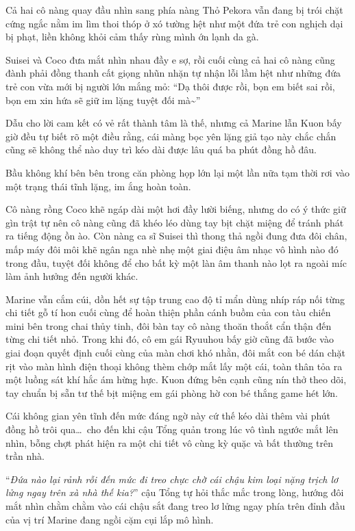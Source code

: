 \documentclass[../main.tex]{subfiles}
\begin{document}
Cả hai cô nàng quay đầu nhìn sang phía nàng Thỏ Pekora vẫn đang bị trói chặt cứng ngắc nằm im lìm thoi thóp ở xó tường hệt như một đứa trẻ con nghịch dại bị phạt, liền không khỏi cảm thấy rùng mình ớn lạnh da gà.

Suisei và Coco đưa mắt nhìn nhau đầy e sợ, rồi cuối cùng cả hai cô nàng cũng đành phải đồng thanh cất giọng nhũn nhặn tự nhận lỗi lầm hệt như những đứa trẻ con vừa mới bị người lớn mắng mỏ: ``Dạ thôi được rồi, bọn em biết sai rồi, bọn em xin hứa sẽ giữ im lặng tuyệt đối mà\~{}''

Dẫu cho lời cam kết có vẻ rất thành tâm là thế, nhưng cả Marine lẫn Kuon bấy giờ đều tự biết rõ một điều rằng, cái màng bọc yên lặng giả tạo này chắc chắn cũng sẽ không thể nào duy trì kéo dài được lâu quá ba phút đồng hồ đâu.

\ct

Bầu không khí bên bên trong căn phòng họp lớn lại một lần nữa tạm thời rơi vào một trạng thái tĩnh lặng, im ắng hoàn toàn.

Cô nàng rồng Coco khẽ ngáp dài một hơi đầy lười biếng, nhưng do có ý thức giữ gìn trật tự nên cô nàng cũng đã khéo léo dùng tay bịt chặt miệng để tránh phát ra tiếng động ồn ào. Còn nàng ca sĩ Suisei thì thong thả ngồi đung đưa đôi chân, mấp máy đôi môi khẽ ngân nga nhè nhẹ một giai điệu âm nhạc vô hình nào đó trong đầu, tuyệt đối không để cho bất kỳ một làn âm thanh nào lọt ra ngoài míc làm ảnh hưởng đến người khác.


Marine vẫn cắm cúi, dồn hết sự tập trung cao độ tỉ mẩn dùng nhíp ráp nối từng chi tiết gỗ tí hon cuối cùng để hoàn thiện phần cánh buồm của con tàu chiến mini bên trong chai thủy tinh, đôi bàn tay cô nàng thoăn thoắt cẩn thận đến từng chi tiết nhỏ. Trong khi đó, cô em gái Ryuuhou bấy giờ cũng đã bước vào giai đoạn quyết định cuối cùng của màn chơi khó nhằn, đôi mắt con bé dán chặt rịt vào màn hình điện thoại không thèm chớp mắt lấy một cái, toàn thân tỏa ra một luồng sát khí hắc ám hừng hực. Kuon đứng bên cạnh cũng nín thở theo dõi, tay chuẩn bị sẵn tư thế bịt miệng em gái phòng hờ con bé thắng game hét lớn.

Cái không gian yên tĩnh đến mức đáng ngờ này cứ thế kéo dài thêm vài phút đồng hồ trôi qua\dots\ cho đến khi cậu Tổng quản trong lúc vô tình ngước mắt lên nhìn, bỗng chợt phát hiện ra một chi tiết vô cùng kỳ quặc và bất thường trên trần nhà.

``\textit{Đứa nào lại rảnh rỗi đến mức đi treo chực chờ cái chậu kim loại nặng trịch lơ lửng ngay trên xà nhà thế kia?}'' cậu Tổng tự hỏi thắc mắc trong lòng, hướng đôi mắt nhìn chằm chằm vào cái chậu sắt đang treo lơ lửng ngay phía trên đỉnh đầu của vị trí Marine đang ngồi cặm cụi lắp mô hình.
\end{document}
